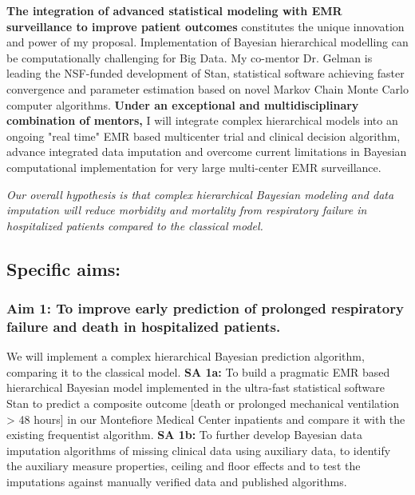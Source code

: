 \documentclass[11pt,notitlepage]{article}
\begin{document}
\newline \textbf{The integration of advanced statistical modeling with EMR surveillance to improve patient outcomes} 
constitutes the unique innovation and power of my proposal. Implementation of Bayesian hierarchical modelling can be computationally challenging for Big Data. My co-mentor Dr. Gelman is leading the NSF-funded development of Stan, statistical software achieving faster convergence and parameter estimation based on novel Markov Chain Monte Carlo computer algorithms. 
\newline \textbf {Under an exceptional and multidisciplinary combination of mentors,} I will integrate complex hierarchical models into an ongoing "real time" EMR based multicenter trial and clinical decision algorithm, advance integrated data imputation and overcome current limitations in Bayesian computational implementation for very large multi-center EMR surveillance. 

\begin{flushleft}
\textit{Our overall hypothesis is that complex hierarchical Bayesian modeling and data imputation will reduce morbidity and mortality from respiratory failure in hospitalized patients compared to the classical model.}
\end{flushleft}

\subsection*{Specific aims:}

\subsubsection*{Aim 1: To improve early prediction of prolonged respiratory failure and death in hospitalized patients.}
We will implement a complex hierarchical Bayesian prediction algorithm, comparing it to the classical model. \newline \textbf{SA 1a:} To build a pragmatic EMR based hierarchical Bayesian model implemented in the ultra-fast statistical software Stan to predict a composite outcome [death or prolonged mechanical ventilation > 48 hours] in our Montefiore Medical Center inpatients and compare it with the existing frequentist algorithm. \newline \textbf{SA 1b:} To further develop Bayesian data imputation algorithms of missing clinical data using auxiliary data, to identify the auxiliary measure properties, ceiling and floor effects and to test the imputations against manually verified data and published algorithms.
\end{document}
